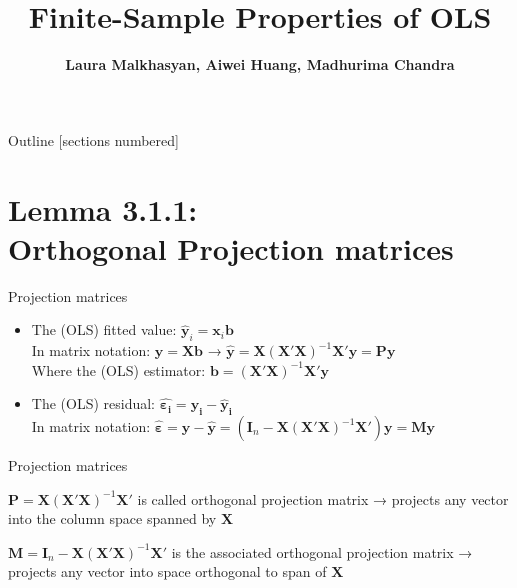 \documentclass[10pt]{beamer}
\title{Finite-Sample Properties of OLS}
\date{}
\author{\textbf{Laura Malkhasyan, Aiwei Huang,  Madhurima Chandra}}
\institute{\textbf{University of Bonn}}
\begin{document}
\maketitle

\begin{frame}{Outline}
  [sections numbered]
  \tableofcontents[hideallsubsections]
\end{frame}

\section {Lemma 3.1.1: \\Orthogonal Projection matrices}

\begin{frame}[fragile]{Projection matrices}
\begin{itemize}
\item The (OLS) fitted value: $\hat{\textbf{y}}_i=\mathbf{x}_i\mathbf{b}$\\
In matrix notation: $\hat{\mathbf{y}}=\mathbf{X}\mathbf{b}$   →   $\hat{\mathbf{y}}=\mathbf{X}(\mathbf{X}'\mathbf{X})^{-1}\mathbf{X}'\mathbf{y} = \mathbf{P}\mathbf{y}$\\
Where the (OLS) estimator: $\mathbf{b}=(\mathbf{X}'\mathbf{X})^{-1}\mathbf{X}'\mathbf{y}$
\bigskip
\item The (OLS) residual: $\mathbf{\hat{\boldsymbol{\varepsilon_i}}=y_i-\hat{y}_i}$\\
    In matrix notation:
    {$\hat{\boldsymbol{\varepsilon}} = \mathbf{y}-\hat{\mathbf{y}} = \left(\mathbf{I}_n-\mathbf{X}(\mathbf{X}'\mathbf{X})^{-1}\mathbf{X}'\right)\mathbf{y} = \mathbf{M}\mathbf{y}$}
\end{itemize}
\end{frame}

\begin{frame}[fragile]{Projection matrices}
\item  $\mathbf{P}=\mathbf{X}(\mathbf{X}'\mathbf{X})^{-1}\mathbf{X}'$ is called orthogonal projection matrix  →  projects any vector into the column space spanned by $\mathbf{X}$\\
\item 
$\mathbf{M}=\mathbf{I}_n-\mathbf{X}(\mathbf{X}'\mathbf{X})^{-1}\mathbf{X}'$ is the associated orthogonal projection matrix →  projects any vector into space orthogonal to span of $\mathbf{X}$ 
\end{frame}
\end{document}

